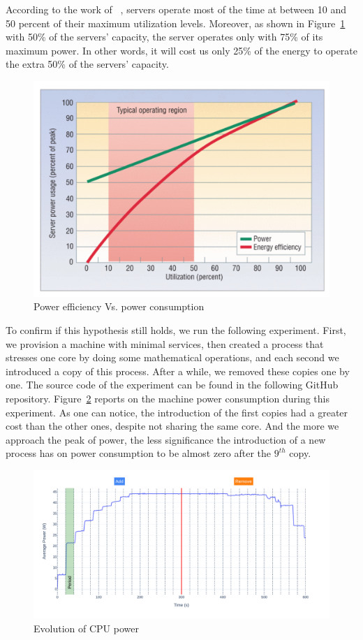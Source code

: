 
According to the work of \citeauthor{barroso2007case}~\cite{barroso2007case}, servers operate most of the time at between 10 and 50 percent of their maximum utilization levels.
Moreover, as shown in Figure~\ref{fig:soa_energy_efficiency} with 50\% of the servers' capacity, the server operates only with 75\% of its maximum power.
In other words, it will cost us only 25\% of the energy to operate the extra 50\% of the servers' capacity.

\begin{figure}[!h]
    \centering
    \includegraphics[width=.7\linewidth,keepaspectratio]{chapters/soa_energy_efficiency}
    \caption{Power efficiency Vs. power consumption~\cite{barroso2007case}}
    \label{fig:soa_energy_efficiency}
\end{figure}

To confirm if this hypothesis still holds, we run the following experiment.
First, we provision a machine with minimal services, then created a process that stresses one core by doing some mathematical operations, and each second we introduced a copy of this process.
After a while, we removed these copies one by one.
The source code of the experiment can be found in the following GitHub repository.
Figure~\ref{fig:power_evolution_greenfaas} reports on the machine power consumption during this experiment.
As one can notice, the introduction of the first copies had a greater cost than the other ones, despite not sharing the same core.
And the more we approach the peak of power, the less significance the introduction of a new process has on power consumption to be almost zero after the $9^{th}$ copy.

\begin{figure}[!h]
    \centering
    \includegraphics[width=\linewidth]{chapters/power_evolution_greenfaas}
    \caption{Evolution of CPU power}
    \label{fig:power_evolution_greenfaas}
\end{figure}

